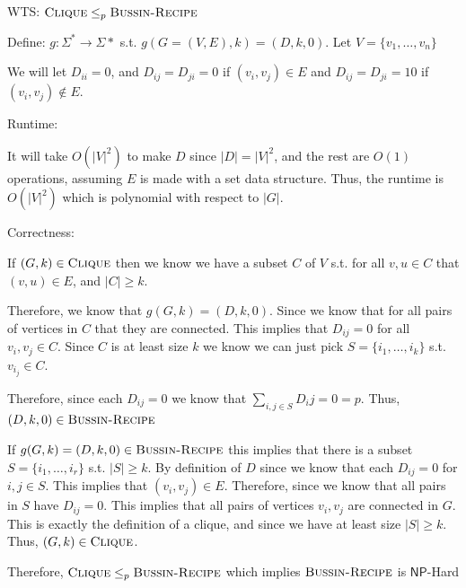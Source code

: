 \documentclass[12pt, letterpaper]{article}
\newcommand{\NP}{\mathsf{NP}}
\begin{document}
\begin{problemproof}
    WTS: $\textsc{Clique} \leq_p \textsc{Bussin-Recipe}$

    Define: $g:\Sigma^* \to \Sigma*$ s.t. $g(G=(V,E),k)=(D,k,0)$. Let $V=\{v_1,\dots,v_n\}$

    We will let $D_{ii}=0$, and $D_{ij}=D_{ji}=0$ if $(v_i,v_j) \in E$ and $D_{ij}=D_{ji}=10$ if $(v_i,v_j) \notin E$.

    Runtime:

    It will take $O(|V|^2)$ to make $D$ since $|D|=|V|^2$, and the rest are $O(1)$ operations, assuming $E$ is made with a set data structure. Thus, the runtime is $O(|V|^2)$ which is polynomial with respect to $|G|$.

    Correctness:

    If $(G,k) \in \textsc{Clique}$ then we know we have a subset $C$ of $V$ s.t. for all $v,u \in C$ that $(v,u) \in E$, and $|C| \geq k$.

    Therefore, we know that $g(G,k)=(D,k,0)$. Since we know that for all pairs of vertices in $C$ that they are connected. This implies that $D_{ij}=0$ for all $v_i,v_j \in C$. Since $C$ is at least size $k$ we know we can just pick $S=\{i_1,\dots,i_k\}$ s.t. $v_{i_j} \in C$.

    Therefore, since each $D_{ij}=0$ we know that $\sum_{i,j \in S} D_ij = 0 =p$. Thus, $(D,k,0) \in \textsc{Bussin-Recipe}$

    If $g(G,k)=(D,k,0) \in \textsc{Bussin-Recipe}$ this implies that there is a subset $S=\{i_1,\dots,i_r\}$ s.t. $|S| \geq k$. By definition of $D$ since we know that each $D_{ij}=0$ for $i,j \in S$. This implies that $(v_i,v_j) \in E$. Therefore, since we know that all pairs in $S$ have $D_{ij}=0$. This implies that all pairs of vertices $v_i,v_j$ are connected in $G$. This is exactly the definition of a clique, and since we have at least size $|S|\geq k$. Thus, $(G,k) \in \textsc{Clique}$.

    Therefore, $\textsc{Clique} \leq_p \textsc{Bussin-Recipe}$ which implies $\textsc{Bussin-Recipe}$ is $\NP$-Hard
\end{problemproof}
\newcommand{\SSUM}{\textsc{SUBSET-SUM}}
\end{document}
